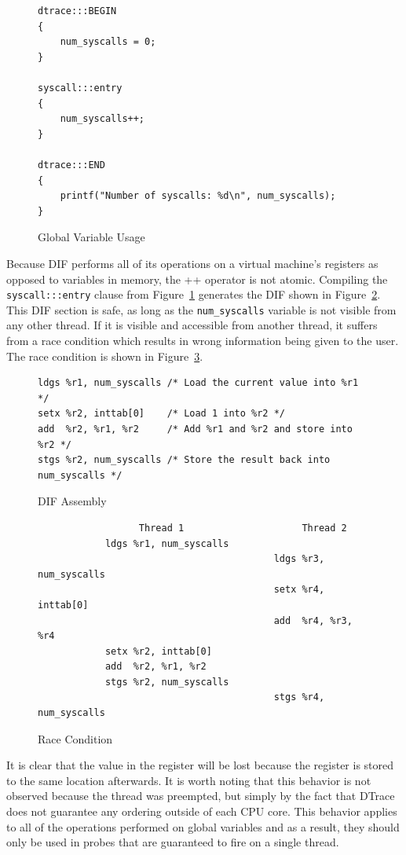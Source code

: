 \begin{figure}
  \begin{lstlisting}
dtrace:::BEGIN
{
    num_syscalls = 0;
}

syscall:::entry
{
    num_syscalls++;
}

dtrace:::END
{
    printf("Number of syscalls: %d\n", num_syscalls);
}
  \end{lstlisting}
  \caption{Global Variable Usage}
  \label{fig:global-var-usage}
\end{figure}

\noindent
Because DIF performs all of its operations on a virtual machine's
registers as opposed to variables in memory, the ++ operator is not
atomic. Compiling the \texttt{syscall:::entry} clause from
Figure~\ref{fig:global-var-usage} generates the DIF shown in
Figure~\ref{fig:dif-asm}.  This DIF section is safe, as long as the
\texttt{num\_syscalls} variable is not visible from any other thread. If it is
visible and accessible from another thread, it suffers from a race
condition which results in wrong information being given to the
user. The race condition is shown in Figure~\ref{fig:race}. \newline

\begin{figure}
\begin{lstlisting}
ldgs %r1, num_syscalls /* Load the current value into %r1 */
setx %r2, inttab[0]    /* Load 1 into %r2 */
add  %r2, %r1, %r2     /* Add %r1 and %r2 and store into %r2 */
stgs %r2, num_syscalls /* Store the result back into num_syscalls */
\end{lstlisting}
\caption{DIF Assembly}
  \label{fig:dif-asm}
\end{figure}

\begin{figure}
  \begin{lstlisting}
                  Thread 1                     Thread 2
            ldgs %r1, num_syscalls
                                          ldgs %r3, num_syscalls
                                          setx %r4, inttab[0]
                                          add  %r4, %r3, %r4
            setx %r2, inttab[0]
            add  %r2, %r1, %r2
            stgs %r2, num_syscalls
                                          stgs %r4, num_syscalls
  \end{lstlisting}
  \caption{Race Condition}
  \label{fig:race}
\end{figure}

\noindent
It is clear that the value in the  register will be lost because
the register  is stored to the same location afterwards. It is
worth noting that this behavior is not observed because the thread was
preempted, but simply by the fact that DTrace does not guarantee any ordering
outside of each CPU core. This behavior applies to all of the operations
performed on global variables and as a result, they should only be used in
probes that are guaranteed to fire on a single thread. \newline

